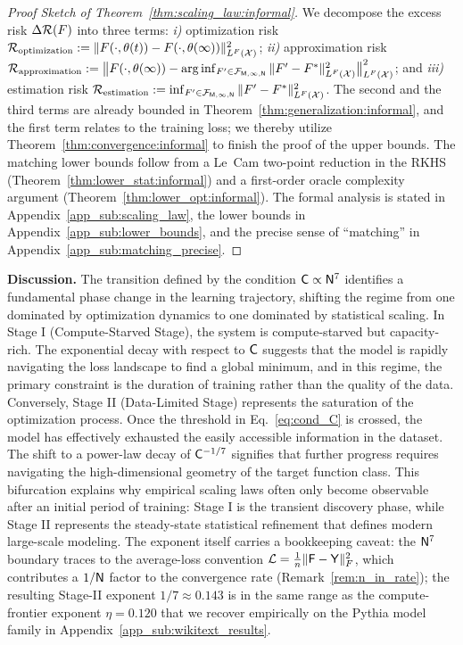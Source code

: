\documentclass[11pt]{article}
\theoremstyle{plain}
\begin{document}
\begin{proof}[Proof Sketch of Theorem~\ref{thm:scaling_law:informal}]
    We decompose the excess risk $\Delta{\cal R}(F)$ into three terms: {\it i)} optimization risk ${\cal R}_{\rm optimization} := \| F(\cdot, \theta(t)) - F(\cdot, \theta(\infty)) \|_{L^F({\cal X})}^2$; {\it ii)} approximation risk ${\cal R}_{\rm approximation} :=  \big\| F(\cdot, \theta(\infty)) - {\rm arg}\inf_{F' \in {\cal F}_{\sf M, \infty, N}} \|F' - F^*\|_{L^F({\cal X})}^2 \big\|_{L^F({\cal X})}^2$; and {\it iii)} estimation risk ${\cal R}_{\rm estimation} := \inf_{F' \in {\cal F}_{\sf M, \infty, N}} \|F' - F^*\|_{L^F({\cal X})}^2$. The second and the third terms are already bounded in Theorem~\ref{thm:generalization:informal}, and the first term relates to the training loss; we thereby utilize Theorem~\ref{thm:convergence:informal} to finish the proof of the upper bounds. The matching lower bounds follow from a Le~Cam two-point reduction in the RKHS (Theorem~\ref{thm:lower_stat:informal}) and a first-order oracle complexity argument (Theorem~\ref{thm:lower_opt:informal}). The formal analysis is stated in Appendix~\ref{app_sub:scaling_law}, the lower bounds in Appendix~\ref{app_sub:lower_bounds}, and the precise sense of ``matching'' in Appendix~\ref{app_sub:matching_precise}.
\end{proof}

{\bf Discussion.} The transition defined by the condition ${\sf C} \propto {\sf N}^7$ identifies a fundamental phase change in the learning trajectory, shifting the regime from one dominated by optimization dynamics to one dominated by statistical scaling. In Stage I (Compute-Starved Stage), the system is compute-starved but capacity-rich. The exponential decay with respect to ${\sf C}$ suggests that the model is rapidly navigating the loss landscape to find a global minimum, and in this regime, the primary constraint is the duration of training rather than the quality of the data. Conversely, Stage II (Data-Limited Stage) represents the saturation of the optimization process. Once the threshold in Eq.~\eqref{eq:cond_C} is crossed, the model has effectively exhausted the easily accessible information in the dataset. The shift to a power-law decay of ${\sf C}^{-1/7}$ signifies that further progress requires navigating the high-dimensional geometry of the target function class. This bifurcation explains why empirical scaling laws often only become observable after an initial period of training: Stage I is the transient discovery phase, while Stage II represents the steady-state statistical refinement that defines modern large-scale modeling. The exponent itself carries a bookkeeping caveat: the ${\sf N}^7$ boundary traces to the average-loss convention ${\cal L} = \frac{1}{n}\|{\sf F}-{\sf Y}\|_F^2$, which contributes a $1/{\sf N}$ factor to the convergence rate (Remark~\ref{rem:n_in_rate}); the resulting Stage-II exponent $1/7 \approx 0.143$ is in the same range as the compute-frontier exponent $\eta = 0.120$ that we recover empirically on the Pythia model family in Appendix~\ref{app_sub:wikitext_results}.
\end{document}
